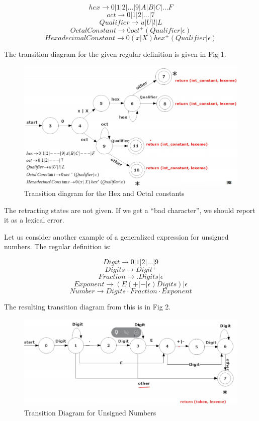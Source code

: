 \documentclass[12pt,letterpaper]{book}
\theoremstyle{definition}
\begin{document}
\[hex \rightarrow 0|1|2|...|9|A|B|C|...F\]
\[oct \rightarrow 0|1|2|...|7\]
\[Qualifier \rightarrow u|U|l|L\]
\[OctalConstant\rightarrow 0 oct^+(Qualifier|\epsilon)\]
\[HexadecimalConstant\rightarrow 0(x|X)hex^+(Qualifier|\epsilon)\]

The transition diagram for the given regular definition is given in Fig 1.

\begin{figure}[htpb]
  \centering
  \includegraphics[width=0.8\linewidth]{./assets/hex_oct_trans_diag.png}
  \caption{Transition diagram for the Hex and Octal constants}%
  \label{fig:}
\end{figure}

The retracting states are not given. If we get a ``bad character'', we should report it as a lexical error.

Let us consider another example of a generalized expression for unsigned numbers. The regular definition is:

\[Digit \rightarrow 0|1|2|...|9\]
\[Digits \rightarrow Digit^+\]
\[Fraction \rightarrow .Digits|\epsilon\]
\[Exponent \rightarrow (E(+|-|\epsilon)Digits)|\epsilon\]
\[Number \rightarrow Digits \cdot Fraction \cdot Exponent\]

The resulting transition diagram from this is in Fig 2.

\begin{figure}[htpb]
  \centering
  \includegraphics[width=0.8\linewidth]{./assets/unsigned_num_trans_diag.png}
  \caption{Transition Diagram for Unsigned Numbers}%
  \label{fig:}
\end{figure}
\end{document}
